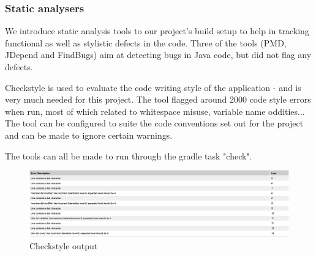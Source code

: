 \subsubsection{Static analysers}
\label{sec:static-analysers}
We introduce static analysis tools to our project's build setup to help in tracking functional as well as stylistic defects in the code. Three of the tools (PMD, JDepend and FindBugs) aim at detecting bugs in Java code, but did not flag any defects. 
\par 
Checkstyle is used to evaluate the code writing style of the application - and is very much needed for this project. The tool flagged around 2000 code style errors when run, most of which related to whitespace misuse, variable name oddities... The tool can be configured to suite the code conventions set out for the project and can be made to ignore certain warnings. 
\par
The tools can all be made to run through the gradle task "check". 

\begin{figure}[H]
\centering
\includegraphics[width=\textwidth]{res/checkstyle.png}
\caption{Checkstyle output}
\end{figure}